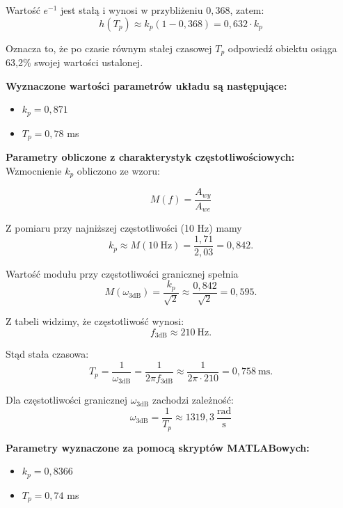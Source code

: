 \documentclass[12pt,a4paper]{article}
\begin{document}
	Wartość $e^{-1}$ jest stałą i wynosi w przybliżeniu $0{,}368$, zatem:
	\begin{equation}
		h(T_p) \approx k_p(1-0{,}368) = 0{,}632 \cdot k_p
	\end{equation}
	
	Oznacza to, że po czasie równym stałej czasowej $T_p$ odpowiedź obiektu osiąga 63,2\% swojej wartości ustalonej.
	
	\textbf{Wyznaczone wartości parametrów układu są następujące:}
	\begin{itemize}
		\item $k_p = 0{,}871$
		\item $T_p = 0{,}78$ ms
	\end{itemize}
	
	\textbf{Parametry obliczone z charakterystyk częstotliwościowych:} \\
	\indent Wzmocnienie $k_p$ obliczono ze wzoru:
	
	\begin{equation}
		M(f)=\frac{A_{wy}}{A_{we}}
	\end{equation}
	
	Z pomiaru przy najniższej częstotliwości (10 Hz) mamy
	\begin{equation}
		k_p \approx M(10\ \text{Hz}) = \frac{1{,}71}{2{,}03} = 0{,}842.
	\end{equation}
	
	Wartość modułu przy częstotliwości granicznej spełnia
	\begin{equation}
		M(\omega_{3\text{dB}})=\frac{k_p}{\sqrt{2}} \approx \frac{0{,}842}{\sqrt{2}} = 0{,}595.
	\end{equation}
	
	Z tabeli widzimy, że częstotliwość wynosi:
	\[
	f_{3\text{dB}} \approx 210\ \text{Hz}.
	\]
	
	Stąd stała czasowa:
	\begin{equation}
		T_p = \frac{1}{\omega_{3\text{dB}}} = \frac{1}{2\pi f_{3\text{dB}}}
		\approx \frac{1}{2\pi\cdot 210} = 0{,}758\ \text{ms}.
	\end{equation}
	
	Dla częstotliwości granicznej $\omega_{3\text{dB}}$ zachodzi zależność:
	\begin{equation}
		\omega_{3\text{dB}} = \frac{1}{T_p} \approx 1319{,}3~\frac{\text{rad}}{\text{s}}
	\end{equation}
	
	\textbf{Parametry wyznaczone za pomocą skryptów MATLABowych:}
	\begin{itemize}
		\item $k_p = 0{,}8366$
		\item $T_p = 0{,}74$ ms
	\end{itemize}
	
\end{document}
